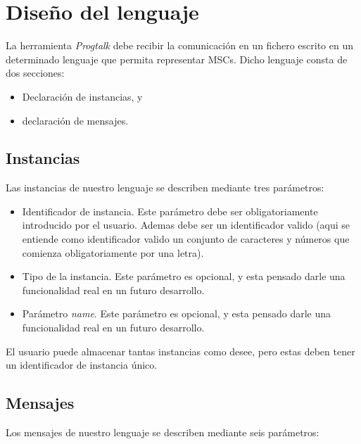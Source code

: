 \documentclass{article}
\begin{document}
\section{Diseño del lenguaje}

La herramienta \textit{Progtalk} debe recibir la comunicación en un fichero escrito en un determinado lenguaje que permita representar MSCs. Dicho lenguaje consta de dos secciones:
\begin{itemize}
\item Declaración de instancias, y
\item declaración de mensajes.
\end{itemize}

\subsection{Instancias}

Las instancias de nuestro lenguaje se describen mediante tres parámetros:

\begin{itemize}
\item Identificador de instancia. Este parámetro debe ser obligatoriamente introducido por el usuario. Ademas debe ser un identificador valido (aqui se entiende como identificador valido un conjunto de caracteres y números que comienza obligatoriamente por una letra).
\item Tipo de la instancia. Este parámetro es opcional, y esta pensado darle una funcionalidad real en un futuro desarrollo.
\item Parámetro \textit{name}. Este parámetro es opcional, y esta pensado darle una funcionalidad real en un futuro desarrollo.
\end{itemize}

El usuario puede almacenar tantas instancias como desee, pero estas deben tener un identificador de instancia único.

\subsection{Mensajes}

Los mensajes de nuestro lenguaje se describen mediante seis parámetros:
\end{document}
